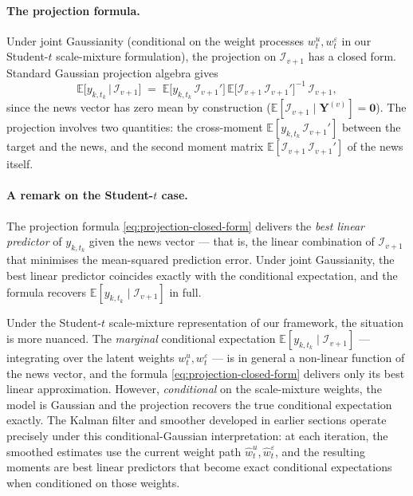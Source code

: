 \documentclass[11pt, a4paper, oneside]{article}
\begin{document}
\paragraph{The projection formula.}
Under joint Gaussianity (conditional on the weight processes
$w^u_t, w^\varepsilon_t$ in our Student-$t$ scale-mixture
formulation), the projection on $\mathcal{I}_{v+1}$ has a closed
form. Standard Gaussian projection algebra gives
\begin{equation}
\mathbb{E}\!\big[y_{k, t_k} \,\big|\, \mathcal{I}_{v+1}\big] \;=\;
\mathbb{E}\!\big[y_{k, t_k}\, \mathcal{I}_{v+1}'\big]
\,
\mathbb{E}\!\big[\mathcal{I}_{v+1}\, \mathcal{I}_{v+1}'\big]^{-1}
\,
\mathcal{I}_{v+1},
\label{eq:projection-closed-form}
\end{equation}
since the news vector has zero mean by construction
($\mathbb{E}[\mathcal{I}_{v+1} \mid \mathbf{Y}^{(v)}] = \mathbf{0}$).
The projection involves two quantities: the cross-moment
$\mathbb{E}[y_{k, t_k}\, \mathcal{I}_{v+1}']$ between the target and
the news, and the second moment matrix
$\mathbb{E}[\mathcal{I}_{v+1}\, \mathcal{I}_{v+1}']$ of the news itself.


\paragraph{A remark on the Student-$t$ case.}
The projection formula \eqref{eq:projection-closed-form}
delivers the \emph{best linear predictor} of $y_{k, t_k}$ given the
news vector — that is, the linear combination of $\mathcal{I}_{v+1}$
that minimises the mean-squared prediction error. Under joint
Gaussianity, the best linear predictor coincides exactly with the
conditional expectation, and the formula recovers
$\mathbb{E}[y_{k, t_k} \mid \mathcal{I}_{v+1}]$ in full.

Under the Student-$t$ scale-mixture representation of our framework,
the situation is more nuanced. The \emph{marginal} conditional
expectation $\mathbb{E}[y_{k, t_k} \mid \mathcal{I}_{v+1}]$ —
integrating over the latent weights $w^u_t, w^\varepsilon_t$ — is
in general a non-linear function of the news vector, and the
formula \eqref{eq:projection-closed-form} delivers only its best
linear approximation. However, \emph{conditional} on the
scale-mixture weights, the model is Gaussian and the projection
recovers the true conditional expectation exactly. The Kalman
filter and smoother developed in earlier sections operate precisely
under this conditional-Gaussian interpretation: at each iteration,
the smoothed estimates use the current weight path
$\hat{w}^u_t, \hat{w}^\varepsilon_t$, and the resulting moments are
best linear predictors that become exact conditional expectations
when conditioned on those weights.
\end{document}
